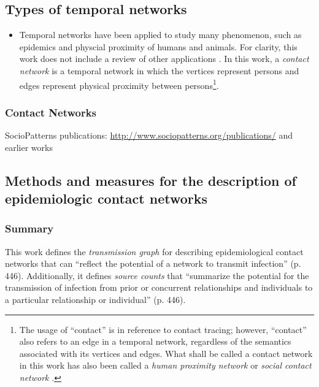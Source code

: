 \subsection{Types of temporal networks}
\begin{itemize}
\item Temporal networks have been applied to study many phenomenon, such as epidemics and physcial proximity of humans and animals. For clarity, this work does not include a review of other applications \cite{Holme2012, Holme2015b}. In this work, a \emph{contact network} is a temporal network in which the vertices represent persons and edges represent physical proximity between persons\footnote{The usage of ``contact'' is in reference to contact tracing; however, ``contact'' also refers to an edge in a temporal network, regardless of the semantics associated with its vertices and edges. What shall be called a contact network in this work has also been called a \emph{human proximity network} \cite{Holme2015b} or \emph{social contact network} \cite{Onaga2017}.}.
\end{itemize}

\subsubsection*{Contact Networks}
SocioPatterns publications: \url{http://www.sociopatterns.org/publications/} and earlier works \cite{Holme2012}

\subsection{Methods and measures for the description of epidemiologic contact networks}
\subsubsection*{Summary}
This work defines the \emph{transmission graph} for describing epidemiological contact networks that can ``reflect the potential of a network to transmit infection'' (p. 446). Additionally, it defines \emph{source counts} that ``summarize the potential for the transmission of infection from prior or concurrent relationships and individuals to a particular relationship or individual'' (p. 446).
